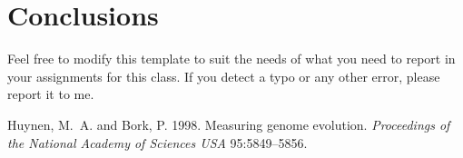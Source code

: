 \documentclass[a4paper]{article}
\begin{document}


\section{Conclusions}
Feel free to modify this template to suit the needs of what you need to report
in your assignments for this class. If you detect a typo or any other error,
please report it to me. 

\footnotesize
\begin{thebibliography}{99}

   Huynen, M.~A. and Bork, P. 1998. Measuring genome evolution.
    \emph{Proceedings of the National Academy of Sciences USA} 95:5849--5856.

\end{thebibliography}
\end{document}
